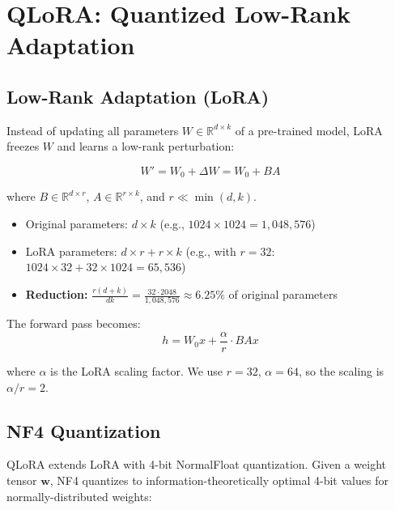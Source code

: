 \documentclass[11pt, a4paper]{article}
\newcommand{\R}{\mathbb{R}}
\begin{document}
\section{QLoRA: Quantized Low-Rank Adaptation}

\subsection{Low-Rank Adaptation (LoRA)}

Instead of updating all parameters $W \in \R^{d \times k}$ of a pre-trained model, LoRA freezes $W$ and learns a low-rank perturbation:

\begin{equation}
W' = W_0 + \Delta W = W_0 + BA
\end{equation}

where $B \in \R^{d \times r}$, $A \in \R^{r \times k}$, and $r \ll \min(d, k)$.

\begin{keyresult}
\begin{itemize}
  \item Original parameters: $d \times k$ (e.g., $1024 \times 1024 = 1{,}048{,}576$)
  \item LoRA parameters: $d \times r + r \times k$ (e.g., with $r=32$: $1024 \times 32 + 32 \times 1024 = 65{,}536$)
  \item \textbf{Reduction:} $\frac{r(d+k)}{dk} = \frac{32 \cdot 2048}{1{,}048{,}576} \approx 6.25\%$ of original parameters
\end{itemize}
\end{keyresult}

The forward pass becomes:
\begin{equation}
h = W_0 x + \frac{\alpha}{r} \cdot B A x
\end{equation}

where $\alpha$ is the LoRA scaling factor. We use $r = 32$, $\alpha = 64$, so the scaling is $\alpha/r = 2$.

\subsection{NF4 Quantization}

QLoRA extends LoRA with 4-bit NormalFloat quantization. Given a weight tensor $\mathbf{w}$, NF4 quantizes to information-theoretically optimal 4-bit values for normally-distributed weights:
\end{document}
